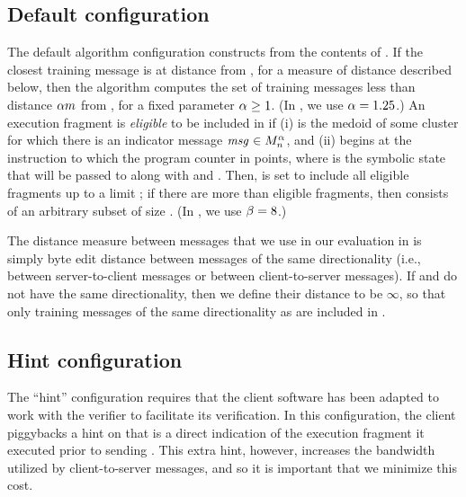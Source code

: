 \subsection{Default configuration}
The default algorithm configuration constructs
\trainingFrags{\msgNmbr} from the contents of \msg{\msgNmbr}.  If the
closest training message is at distance \closestMsgDist from
\msg{\msgNmbr}, for a measure of distance described below, then the
algorithm computes the set \closeMsgs{\msgNmbr}{\radiusExpansion} of
training messages less than distance $\alpha m$
from \msg{\msgNmbr}, for a fixed parameter $\alpha \ge 1$.
(In , we use $\alpha = 1.25$.)  An
execution fragment \trainingFrag is \textit{eligible} to be included
in \trainingFrags{\msgNmbr} if (i) \trainingFrag is the medoid of some
cluster for which there is an indicator message $\mathit{msg}_{} \in
M_{n}^{\alpha}$, and (ii) \trainingFrag begins
at the instruction to which the program counter in
 points, where  is the
symbolic state that will be passed to \verifyAlg along with
\msg{\msgNmbr} and \trainingFrags{\msgNmbr}.  Then,
\trainingFrags{\msgNmbr} is set to include all eligible fragments up
to a limit \trainingFragLimit; if there are more than
\trainingFragLimit eligible fragments, then \trainingFrags{\msgNmbr}
consists of an arbitrary subset of size \trainingFragLimit. (In
, we use $\beta = 8$.)

The distance measure between messages that we use in our evaluation in
 is simply byte edit distance between messages of the
same directionality (i.e., between server-to-client messages or
between client-to-server messages).  If \msg{} and \msg{\msgNmbr} do
not have the same directionality, then we define their distance to be
$\infty$, so that only training messages of the same directionality as
\msg{\msgNmbr} are included in \closeMsgs{\msgNmbr}{\radiusExpansion}.

\subsection{Hint configuration}
The ``hint'' configuration requires that the client software has been
adapted to work with the verifier to facilitate its verification.  In
this configuration, the client piggybacks a hint on \msg{\msgNmbr}
that is a direct indication of the execution fragment it executed
prior to sending \msg{\msgNmbr}.  This extra hint, however, increases
the bandwidth utilized by client-to-server messages, and so it is
important that we minimize this cost.

